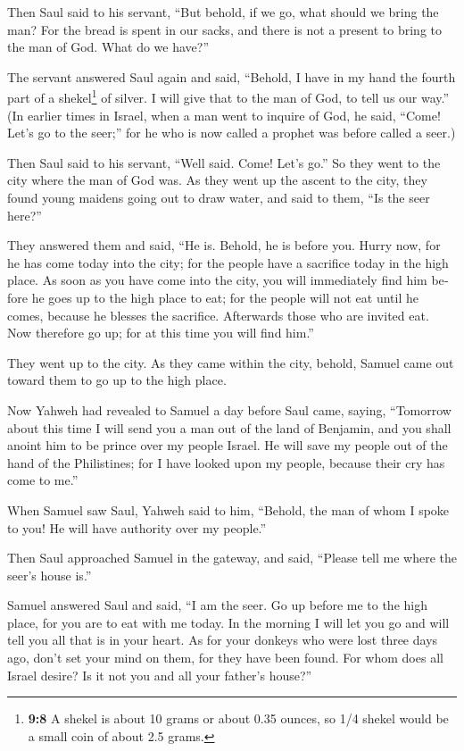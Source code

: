 \begin{paracol}{2}
\begin{otherlanguage}{english}
 Then Saul said to his servant, ``But behold, if we go,
what should we bring the man? For the bread is spent in our sacks, and
there is not a present to bring to the man of God. What do we have?''

 The servant answered Saul again and said, ``Behold, I
have in my hand the fourth part of a shekel\footnote{\textbf{9:8} A
  shekel is about 10 grams or about 0.35 ounces, so 1/4 shekel would be
  a small coin of about 2.5 grams.} of silver. I will give that to the
man of God, to tell us our way.''  (In earlier times in
Israel, when a man went to inquire of God, he said, ``Come! Let's go to
the seer;'' for he who is now called a prophet was before called a
seer.)

 Then Saul said to his servant, ``Well said. Come! Let's
go.'' So they went to the city where the man of God was. 
As they went up the ascent to the city, they found young maidens going
out to draw water, and said to them, ``Is the seer here?''

 They answered them and said, ``He is. Behold, he is
before you. Hurry now, for he has come today into the city; for the
people have a sacrifice today in the high place.  As soon
as you have come into the city, you will immediately find him before he
goes up to the high place to eat; for the people will not eat until he
comes, because he blesses the sacrifice. Afterwards those who are
invited eat. Now therefore go up; for at this time you will find him.''

 They went up to the city. As they came within the city,
behold, Samuel came out toward them to go up to the high place.

 Now Yahweh had revealed to Samuel a day before Saul
came, saying,  ``Tomorrow about this time I will send you
a man out of the land of Benjamin, and you shall anoint him to be prince
over my people Israel. He will save my people out of the hand of the
Philistines; for I have looked upon my people, because their cry has
come to me.''

 When Samuel saw Saul, Yahweh said to him, ``Behold, the
man of whom I spoke to you! He will have authority over my people.''

 Then Saul approached Samuel in the gateway, and said,
``Please tell me where the seer's house is.''

 Samuel answered Saul and said, ``I am the seer. Go up
before me to the high place, for you are to eat with me today. In the
morning I will let you go and will tell you all that is in your heart.
 As for your donkeys who were lost three days ago, don't
set your mind on them, for they have been found. For whom does all
Israel desire? Is it not you and all your father's house?''


\end{otherlanguage}
\end{paracol}
